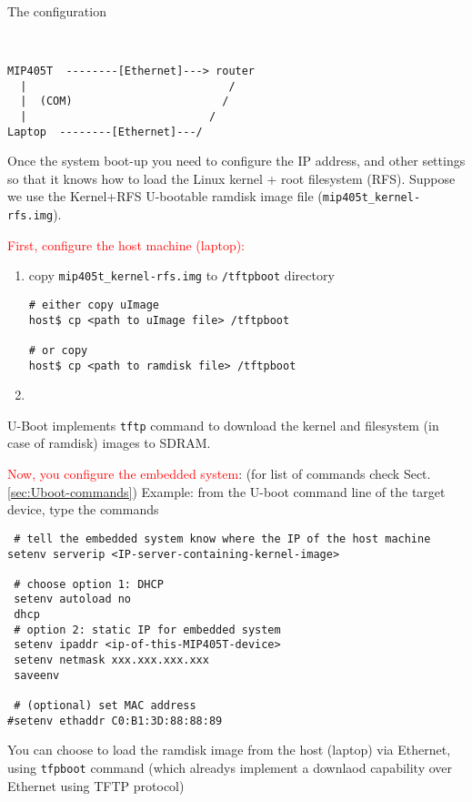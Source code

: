 The configuration
\begin{verbatim}


MIP405T  --------[Ethernet]---> router
  |                               /
  |  (COM)                       /
  |                            /
Laptop  --------[Ethernet]---/ 
\end{verbatim}

Once the system boot-up you need to configure the IP address, and other settings
so that it knows how to load the Linux kernel + root filesystem (RFS).
Suppose we use the Kernel+RFS U-bootable ramdisk image file
(\verb!mip405t_kernel-rfs.img!). 

\textcolor{red}{First, configure the host machine (laptop):}
\begin{enumerate}
  \item copy \verb!mip405t_kernel-rfs.img! to \verb!/tftpboot! directory

\begin{verbatim}
# either copy uImage
host$ cp <path to uImage file> /tftpboot

# or copy
host$ cp <path to ramdisk file> /tftpboot
\end{verbatim}  
  \item 
\end{enumerate}

\begin{mdframed}
U-Boot implements \verb!tftp! command to download the kernel and filesystem (in
case of ramdisk) images to SDRAM.
\end{mdframed}

\textcolor{red}{Now, you configure the embedded system}: (for list of commands
check Sect.\ref{sec:Uboot-commands}) Example: from the U-boot command line of
the target device, type the commands
\begin{verbatim}
 # tell the embedded system know where the IP of the host machine
setenv serverip <IP-server-containing-kernel-image>

 # choose option 1: DHCP
 setenv autoload no
 dhcp 
 # option 2: static IP for embedded system
 setenv ipaddr <ip-of-this-MIP405T-device>
 setenv netmask xxx.xxx.xxx.xxx
 saveenv
  
 # (optional) set MAC address
#setenv ethaddr C0:B1:3D:88:88:89 
\end{verbatim}

You can choose to load the ramdisk image from the host (laptop) via Ethernet, 
using \verb!tfpboot! command (which alreadys implement a downlaod capability
over Ethernet using TFTP protocol)

